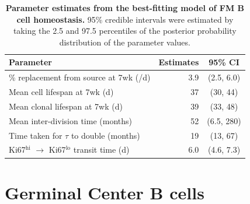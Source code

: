 \documentclass[12pt]{article}
\newcommand{\khi}{Ki67$^\text{hi}$}
\newcommand{\klo}{Ki67$^\text{lo}$}
\begin{document}
	\begin{table}[htbp]
		\begin{center}
			\renewcommand{\arraystretch}{1.25}
			{\small 
				\begin{tabular}{l r c}
					\toprule
					\textbf{Parameter}                                & \textbf{Estimates}   &   \textbf{95\% CI} \\
					\toprule
					\% replacement from source at 7wk (/d)            & 3.9                  &  (2.5, 6.0)      \\
					Mean cell lifespan at 7wk (d)                     & 37                   &  (30, 44)  \\				
					Mean clonal lifespan at 7wk (d)                   & 39                   &  (33, 48)  \\
					Mean inter-division time (months)                 & 52                   &  (6.5, 280)  \\
					Time taken for $\tau$ to double (months)           & 19                   &  (13, 67)  \\
					{\khi} $\rightarrow$ {\klo} transit time (d)      & 6.0                  &  (4.6, 7.3)  \\			
					\hline
					\toprule 
				\end{tabular}
			}
		\end{center}
		\caption{\textbf{Parameter estimates from the best-fitting model of FM B cell homeostasis.} 95\% credible intervals were estimated by taking the 2.5 and 97.5 percentiles of the posterior probability distribution of the parameter values.}
		\label{tab:FM-pars}
	\end{table} 

	
	\clearpage
	\section*{Germinal Center B cells}
\end{document}
